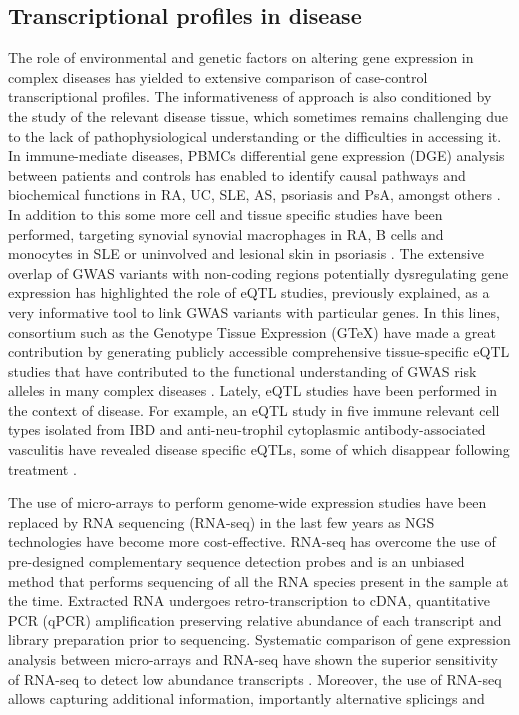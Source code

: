 \subsection{Transcriptional profiles in disease}
The role of environmental and genetic factors on altering gene expression in complex diseases has yielded to extensive comparison of case-control transcriptional profiles. The informativeness of approach is also conditioned by the study of the relevant disease tissue, which sometimes remains challenging due to the lack of pathophysiological understanding or the difficulties in accessing it. In immune-mediate diseases, PBMCs differential gene expression (DGE) analysis between patients and controls has enabled to identify causal pathways and biochemical functions in RA, UC, SLE, AS, psoriasis and PsA, amongst others \parencite{MIao2013,Junta2009,Baechler2003,Assassi2010,Batliwalla2005}. In addition to this some more cell and tissue specific studies have been performed, targeting synovial synovial macrophages in RA, B cells and monocytes in SLE or uninvolved and lesional skin in psoriasis \parencite{Katschke2001,Dozmorov2015,Jabbari2012}. The extensive overlap of GWAS variants with non-coding regions potentially dysregulating gene expression has highlighted the role of eQTL studies, previously explained, as a very informative tool to link GWAS variants with particular genes. In this lines, consortium such as the Genotype
Tissue Expression (GTeX) have made a great contribution by generating publicly accessible comprehensive tissue-specific eQTL studies that have contributed to the functional understanding of GWAS risk alleles in many complex diseases . Lately, eQTL studies have been performed in the context of disease. For example, an eQTL study in five immune relevant cell types isolated from IBD and anti-neu-trophil cytoplasmic antibody-associated vasculitis have revealed disease specific eQTLs, some of which disappear following treatment \parencite{Peters2016}.

The use of micro-arrays to perform genome-wide expression studies have been replaced by RNA sequencing (RNA-seq) in the last few years as NGS technologies have become more cost-effective. RNA-seq has overcome the use of pre-designed complementary sequence detection probes and is an unbiased method that performs sequencing of all the RNA species present in the sample at the time. Extracted RNA undergoes retro-transcription to cDNA, quantitative PCR (qPCR) amplification preserving relative abundance of each transcript and library preparation prior to sequencing. Systematic comparison of gene expression analysis between micro-arrays and RNA-seq have shown the superior sensitivity of RNA-seq to detect low abundance transcripts \parencite{Zhao2014}. Moreover, the use of RNA-seq allows capturing additional information, importantly alternative splicings and 

